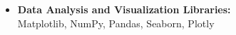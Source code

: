 \documentclass[12pt]{article}
\begin{document}
\begin{itemize}
\begin{itemize}

		\item \textbf{Data Analysis and Visualization Libraries:}\\
		Matplotlib, NumPy, Pandas, Seaborn, Plotly


\end{itemize}
\end{itemize}
\end{document}
